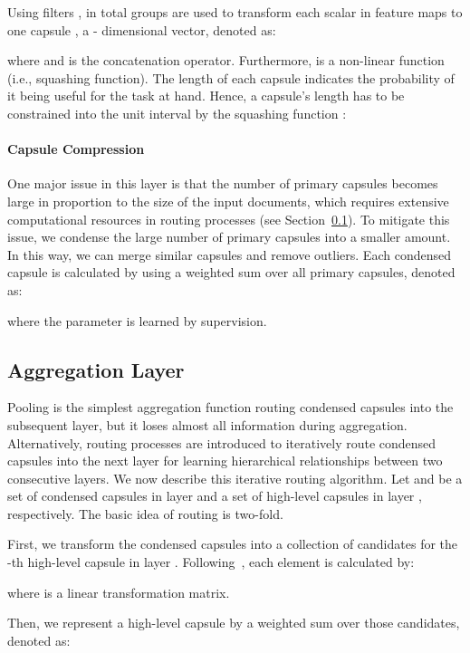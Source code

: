 \documentclass[11pt,a4paper]{article}
\newcommand{\1}{\boldsymbol{1}}
\begin{document}
Using  filters , in total  groups are used to 
transform each scalar  in feature maps to one capsule , a - dimensional vector, denoted as:

where  and  is the concatenation operator.
Furthermore,  is a non-linear function (i.e., squashing function).
The length  of each capsule  
indicates the probability of it being useful for the task at hand.
Hence, a capsule's length has to be constrained into the unit interval  by the squashing function : 


\paragraph{Capsule Compression} 

One major issue in this layer is that the number of primary capsules becomes large in proportion to the size of the 
input documents, which requires extensive computational resources
in routing processes 
(see Section~\ref{sec:agg}). To mitigate this issue, we condense the large number of primary capsules into a smaller amount. In this way, we can merge similar capsules and remove outliers.
Each condensed capsule  is calculated by using a weighted sum over all primary capsules, denoted as: 

where the parameter  is learned by supervision.


\subsection{Aggregation Layer}\label{sec:agg}
Pooling is the simplest aggregation function routing condensed capsules into the subsequent layer, 
but it loses almost all information during aggregation. 
Alternatively, routing processes are introduced to iteratively route condensed capsules into the next layer
for
learning hierarchical relationships between two consecutive layers.
We now describe this iterative routing algorithm. 
Let  and  be a set of condensed capsules in layer  and a set of high-level capsules in layer , respectively. The basic idea of routing is two-fold.

First, we transform the condensed capsules into a collection of candidates  
for the 
-th high-level capsule in layer . 
Following~\citet{sabour2017dynamic}, each element  is calculated by: 
\vspace{-0.02in}

where  is a linear transformation matrix.

Then, we represent a high-level capsule  by a weighted sum over those candidates,
denoted as:
\vspace{-0.19in}
\end{document}
